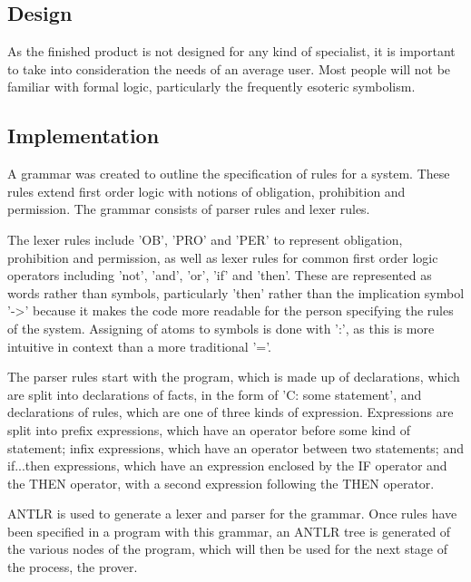 \documentclass{l4proj}
\begin{document}

\subsection{Design}
As the finished product is not designed for any kind of specialist, it is important to take into consideration the needs of an average user. Most people will not be familiar with formal logic, particularly the frequently esoteric symbolism. 


\subsection{Implementation}
A grammar was created to outline the specification of rules for a system. These rules extend first order logic with notions of obligation, prohibition and permission. The grammar consists of parser rules and lexer rules. 

The lexer rules include 'OB', 'PRO' and 'PER' to represent obligation, prohibition and permission, as well as lexer rules for common first order logic operators including 'not', 'and', 'or', 'if' and 'then'. These are represented as words rather than symbols, particularly 'then' rather than the implication symbol '->' because it makes the code more readable for the person specifying the rules of the system. Assigning of atoms to symbols is done with ':', as this is more intuitive in context than a more traditional '='. 

The parser rules start with the program, which is made up of declarations, which are split into declarations of facts, in the form of 'C: some statement', and declarations of rules, which are one of three kinds of expression. Expressions are split into prefix expressions, which have an operator before some kind of statement; infix expressions, which have an operator between two statements; and if...then expressions, which have an expression enclosed by the IF operator and the THEN operator, with a second expression following the THEN operator. 

ANTLR is used to generate a lexer and parser for the grammar. Once rules have been specified in a program with this grammar, an ANTLR tree is generated of the various nodes of the program, which will then be used for the next stage of the process, the prover. 

\end{document}
